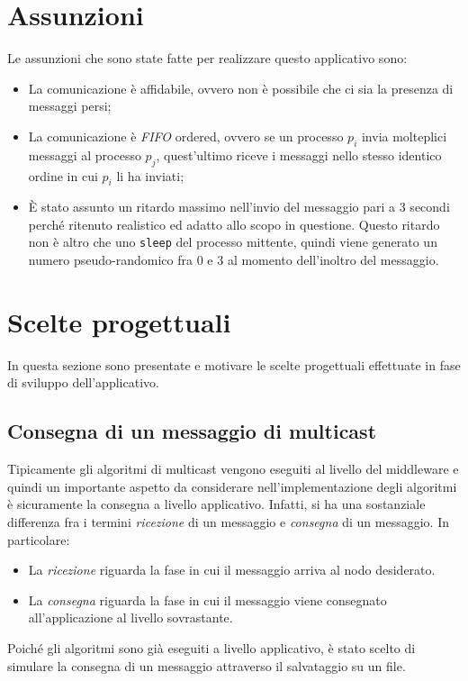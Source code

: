 \documentclass[acmtog]{acmart}
\begin{document}
\section{Assunzioni}
Le assunzioni che sono state fatte per realizzare questo applicativo sono:
\begin{itemize}
\item La comunicazione è affidabile, ovvero non è possibile che ci sia la presenza di messaggi persi;
\item La comunicazione è \textit{FIFO} ordered, ovvero se un processo $p_i$ invia molteplici messaggi al processo $p_j$, quest'ultimo riceve i messaggi nello stesso identico ordine in cui $p_i$ li ha inviati;
\item È stato assunto un ritardo massimo nell'invio del messaggio pari a $3$ secondi perché ritenuto realistico ed adatto allo scopo in questione. Questo ritardo non è altro che uno \texttt{sleep} del processo mittente, quindi viene generato un numero pseudo-randomico fra $0$ e $3$ al momento dell'inoltro del messaggio.
\end{itemize}

\section{Scelte progettuali}
In questa sezione sono presentate e motivare le scelte progettuali effettuate in fase di sviluppo dell'applicativo.

\subsection{Consegna di un messaggio di multicast}
Tipicamente gli algoritmi di multicast vengono eseguiti al livello del middleware e quindi un importante aspetto da considerare nell'implementazione degli algoritmi è sicuramente la consegna a livello applicativo. Infatti, si ha una sostanziale differenza fra i termini \textit{ricezione} di un messaggio e \textit{consegna} di un messaggio. In particolare:
\begin{itemize}
\item La \textit{ricezione} riguarda la fase in cui il messaggio arriva al nodo desiderato. 
\item La \textit{consegna} riguarda la fase in cui il messaggio viene consegnato all'applicazione al livello sovrastante.
\end{itemize}

Poiché gli algoritmi sono già eseguiti a livello applicativo, è stato scelto di simulare la consegna di un messaggio attraverso il salvataggio su un file. 
\end{document}
